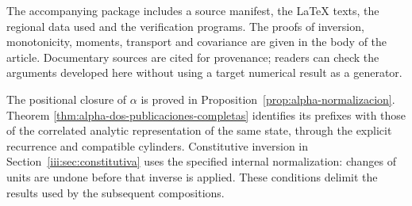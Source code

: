 The accompanying package includes a source manifest, the LaTeX texts,
the regional data used and the verification programs. The proofs
of inversion, monotonicity, moments, transport and covariance are given
in the body of the article. Documentary sources are cited for
provenance; readers can check the arguments developed here
without using a target numerical result as a generator.

The positional closure of $\alpha$ is proved in
Proposition~\ref{prop:alpha-normalizacion}. Theorem
\ref{thm:alpha-dos-publicaciones-completas} identifies its prefixes with
those of the correlated analytic representation of the same state,
through the explicit recurrence and compatible cylinders.
Constitutive inversion in
Section~\ref{iii:sec:constitutiva} uses the specified internal
normalization: changes of units are undone before that inverse is
applied. These conditions delimit the results used by the subsequent
compositions.
